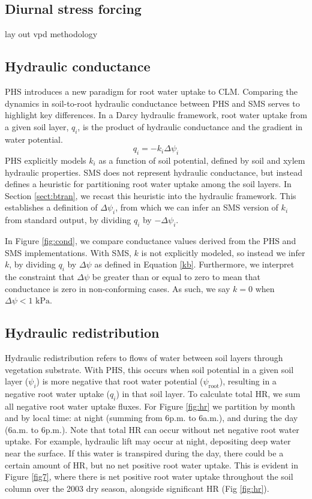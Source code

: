 \documentclass[draft,linenumbers]{agujournal}
\begin{document}
\subsection{Diurnal stress forcing}
lay out vpd methodology

\subsection{Hydraulic conductance}
PHS introduces a new paradigm for root water uptake to CLM.
Comparing the dynamics in soil-to-root hydraulic conductance between PHS and SMS serves to highlight key differences.
In a Darcy hydraulic framework, root water uptake from a given soil layer, $q_i$, is the product of hydraulic conductance and the gradient in water potential.
\begin{equation}
q_i = -k_i\Delta\psi_i
\end{equation}
PHS explicitly models $k_i$ as a function of soil potential, defined by soil and xylem hydraulic properties.
SMS does not represent hydraulic conductance, but instead defines a heuristic for partitioning root water uptake among the soil layers.
In Section \ref{sect:btran}, we recast this heuristic into the hydraulic framework.
This establishes a definition of $\Delta\psi_i$, from which we can infer an SMS version of $k_i$ from standard output, by dividing $q_i$ by $-\Delta\psi_i$.



    In Figure \ref{fig:cond}, we compare conductance values derived from the PHS and SMS implementations.
    With SMS, $k$ is not explicitly modeled, so instead we infer $k$, 
    by dividing $q_i$ by $\Delta\psi$ as defined in Equation \ref{kb}.
    Furthermore, we interpret the constraint that $\Delta\psi$ be greater than or equal to zero to mean 
    that conductance is zero in non-conforming cases. As such, we say $k=0$ when $\Delta\psi<\text{1 kPa}$.

\subsection{Hydraulic redistribution}
Hydraulic redistribution refers to flows of water between soil layers through vegetation substrate.
With PHS, this occurs when soil potential in a given soil layer ($\psi_i$) is more negative that root water potential ($\psi_{\text{root}}$), resulting in a negative root water uptake ($q_i$) in that soil layer.
To calculate total HR, we sum all negative root water uptake fluxes.
For Figure \ref{fig:hr} we partition by month and by local time: at night (summing from 6p.m. to 6a.m.), and during the day (6a.m. to 6p.m.).
Note that total HR can occur without net negative root water uptake.
For example, hydraulic lift may occur at night, depositing deep water near the surface.
If this water is transpired during the day, there could be a certain amount of HR, but no net positive root water uptake.
This is evident in Figure \ref{fig7}, where there is net positive root water uptake throughout the soil column over the 2003 dry season, alongside significant HR (Fig \ref{fig:hr}).
\end{document}
